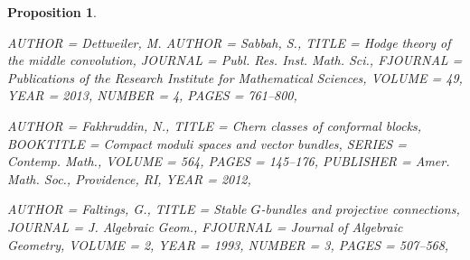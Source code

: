 \documentclass[11pt]{amsart}
\newtheorem{proposition}[theorem]{Proposition}
\numberwithin{theorem}{subsection}
\begin{document}
{\begin{proposition}
\begin{bibdiv}
\begin{biblist}
{ %
}
\fi

{} {
    AUTHOR = {Dettweiler, M.}
    AUTHOR =  {Sabbah, S.},
     TITLE = {Hodge theory of the middle convolution},
   JOURNAL = {Publ. Res. Inst. Math. Sci.},
  FJOURNAL = {Publications of the Research Institute for Mathematical
              Sciences},
    VOLUME = {49},
      YEAR = {2013},
    NUMBER = {4},
     PAGES = {761--800},
}


 {
    AUTHOR = {Fakhruddin, N.},
     TITLE = {Chern classes of conformal blocks},
 BOOKTITLE = {Compact moduli spaces and vector bundles},
    SERIES = {Contemp. Math.},
    VOLUME = {564},
     PAGES = {145--176},
 PUBLISHER = {Amer. Math. Soc., Providence, RI},
      YEAR = {2012},
}

 {
    AUTHOR = {Faltings, G.},
     TITLE = {Stable {$G$}-bundles and projective connections},
   JOURNAL = {J. Algebraic Geom.},
  FJOURNAL = {Journal of Algebraic Geometry},
    VOLUME = {2},
      YEAR = {1993},
    NUMBER = {3},
     PAGES = {507--568},
}




\end{biblist}
\end{bibdiv}
\end{proposition}}
\end{document}
